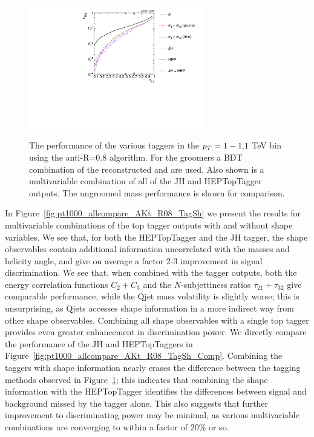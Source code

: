 \begin{figure}
\centering
{\includegraphics[width=0.68\textwidth]{./Figures/TTagging/multi_variable/pT.1TeV.R.0.8/Rocs_tagger_groom.pdf}}
\caption{The performance of the various taggers in the $p_T = 1-1.1$ TeV bin using the anti-\kT R=0.8 algorithm. For the groomers a BDT combination of the reconstructed \topmass and \wmass are used. Also shown is a multivariable combination of all of the JH and HEPTopTagger outputs. The ungroomed mass performance is shown for comparison.}
\label{fig:pt1000_allcompare_AKt_R08_TG}
\end{figure}


In Figure~\ref{fig:pt1000_allcompare_AKt_R08_TagSh} we present the results for multivariable combinations of the top tagger outputs with and without shape variables. We see that, for both the HEPTopTagger and the JH tagger, the shape observables contain additional information uncorrelated with the masses and helicity angle, and give on average a factor 2-3 improvement in signal discrimination. We see that, when combined with the tagger outputs, both the energy correlation functions $C_2+C_3$ and the $N$-subjettiness ratios $\tau_{21}+\tau_{32}$ give comparable performance, while the Qjet mass volatility is slightly worse; this is unsurprising, as Qjets accesses shape information in a more indirect way from other shape observables. Combining all shape observables with a single top tagger provides even greater enhancement in discrimination power. We directly compare the performance of the JH and HEPTopTaggers in Figure~\ref{fig:pt1000_allcompare_AKt_R08_TagSh_Comp}. Combining the taggers with shape information nearly erases the difference between the tagging methods observed in Figure~\ref{fig:pt1000_allcompare_AKt_R08_TG}; this indicates that combining the shape information with the HEPTopTagger identifies the differences between signal and background missed by the tagger alone. This also suggests that further improvement to discriminating power may be minimal, as various multivariable combinations are converging to within a factor of 20\% or so.


